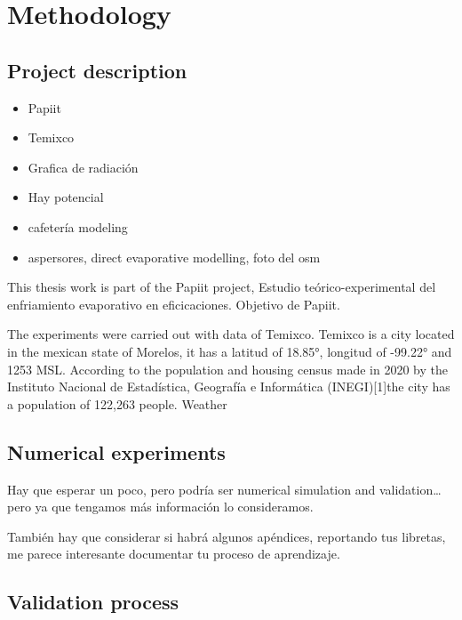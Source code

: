 \chapter{Methodology}
\label{chap:methodology}

 
 
 \section{Project description}
 
 \begin{itemize}
  	\item Papiit
 	\item Temixco
 	\item Grafica de radiación
 	\item Hay potencial
 	\item cafetería modeling
 	\item aspersores, direct evaporative modelling, foto del osm
 \end{itemize}
 

This thesis work is part of the Papiit project, Estudio teórico-experimental del enfriamiento evaporativo en eficicaciones.
Objetivo de Papiit. 

The experiments were carried out with data of Temixco. Temixco is a city located in the mexican state of Morelos, it has a latitud of 18.85°, longitud of -99.22° and 1253 MSL. According to the population and housing census made in 2020 by the Instituto Nacional de Estadística, Geografía e Informática (INEGI)[1]the city has a population of 122,263 people. 
Weather



 
 
 \section{Numerical experiments}
 
 Hay que esperar un poco, pero podría ser numerical simulation and validation… pero ya que tengamos más información lo consideramos.


También hay que considerar si habrá algunos apéndices, reportando tus libretas, me parece interesante documentar tu proceso de aprendizaje.
 
 \section{Validation process}
 

